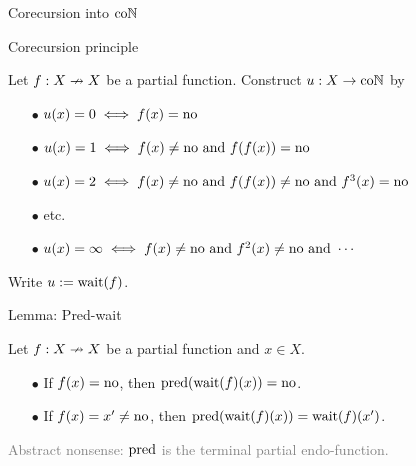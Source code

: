 \begin{frame}{Corecursion into $\mathrm{co}\mathbb{N}$} %

  \begin{block}{Corecursion principle}
    \par Let $f : X \nrightarrow X$ be a partial function. Construct $u : X \to \mathrm{co}\mathbb{N}$ by{\pause}
    \begin{itemize}[nosep]
      \item[$\bullet$] $u(x) = 0 \iff f(x) = \mathrm{no}${\pause}
      \item[$\bullet$] $u(x) = 1 \iff f(x) \neq \mathrm{no} \text{ and } f(f(x)) = \mathrm{no}${\pause}
      \item[$\bullet$] $u(x) = 2 \iff f(x) \neq \mathrm{no} \text{ and } f(f(x)) \neq \mathrm{no} \text{ and } f^3 (x) = \mathrm{no}$
      \item[$\bullet$] etc.{\pause}
      \item[$\bullet$] $u(x) = \infty \iff f(x) \neq \mathrm{no} \text{ and } f^2 (x) \neq \mathrm{no} \text{ and } \cdots${\pause}
    \end{itemize}
    \par Write $u := \operatorname{wait} (f)$.
  \end{block}

  \pause

  \begin{block}{Lemma: Pred-wait}
    
    \par Let $f : X \nrightarrow X$ be a partial function and $x \in X$.
    \begin{itemize}[nosep]
      \item[$\bullet$] If $f(x) = \mathrm{no}$, then $\operatorname{pred}(\operatorname{wait}(f)(x)) = \mathrm{no}$.
      \item[$\bullet$] If $f(x) = x' \neq \mathrm{no}$, then $\operatorname{pred}(\operatorname{wait}(f)(x)) = \operatorname{wait}(f)(x')$.
    \end{itemize}

  \end{block}

  \par \textcolor{gray}{Abstract nonsense: $\operatorname{pred}$ is the terminal partial endo-function.}

\end{frame}


